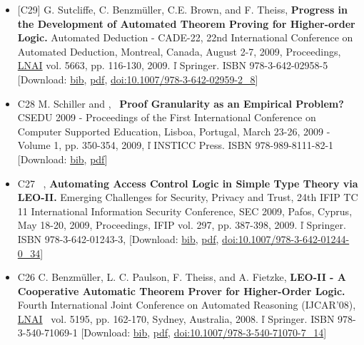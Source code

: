 \documentclass{article}
\newcommand{\tmtextbf}[1]{{\bfseries{#1}}}
\newcommand{\tmtextit}[1]{{\itshape{#1}}}
\newcommand{\tmtextmd}[1]{{\mdseries{#1}}}
\newcommand{\tmtextup}[1]{{\upshape{#1}}}
\newenvironment{itemizedot}{\begin{itemize} \renewcommand{\labelitemi}{$\bullet$}\renewcommand{\labelitemii}{$\bullet$}\renewcommand{\labelitemiii}{$\bullet$}\renewcommand{\labelitemiv}{$\bullet$}}{\end{itemize}}
\begin{document}
\begin{itemizedot}
  \item {\small [C29] G. Sutcliffe, C. Benzm\"uller, C.E. Brown, and F.
  Theiss, \tmtextbf{Progress in the Development of Automated Theorem Proving
  for Higher-order Logic.}} {\small Automated Deduction - CADE-22, 22nd
  International Conference on Automated Deduction, Montreal, Canada, August
  2-7, 2009, Proceedings, \href{http://www.springer.de/comp/lncs/}{LNAI} vol.
  5663, pp. 116-130, 2009.  \v{l}  Springer.} ISBN 978-3-642-02958-5
  {\color{grey} [Download: {\small \href{../papers/C29.bib}{bib},
  \href{../papers/C29.pdf}{pdf}}, {\small
  \href{http://dx.doi.org/10.1007/978-3-642-02959-2\_8}{doi:10.1007/978-3-642-02959-2\_8}}]}
  
  \item [C28] M. Schiller and {\small \tmtextit{\tmtextmd{\tmtextup{C.
  Benzm\"uller}}},} \ {\small \tmtextbf{Proof Granularity as an Empirical
  Problem?}} CSEDU 2009 - Proceedings of the First International Conference on
  Computer Supported Education, Lisboa, Portugal, March 23-26, 2009 - Volume
  1, pp. 350-354, 2009,  \v{l}  INSTICC Press. ISBN 978-989-8111-82-1
  {\color{grey} [Download: {\small \href{../papers/C28.bib}{bib}}, {\small
  \href{../papers/C28.pdf}{pdf}}]}
  
  \item [C27] \ {\small \tmtextit{\tmtextmd{\tmtextup{C. Benzm\"uller}}},}
  {\small \tmtextbf{Automating Access Control Logic in Simple Type Theory via
  LEO-II.}} Emerging Challenges for Security, Privacy and Trust, 24th IFIP TC
  11 International Information Security Conference, SEC 2009, Pafos, Cyprus,
  May 18-20, 2009, Proceedings, IFIP vol. 297, pp. 387-398, 2009.  \v{l} 
  Springer. ISBN 978-3-642-01243-3, {\color{grey} [Download: {\small
  \href{../papers/C27.bib}{bib}}, {\small \href{../papers/C27.pdf}{pdf}},
  {\small
  \href{http://dx.doi.org/10.1007/978-3-642-01244-0\_34}{doi:10.1007/978-3-642-01244-0\_34}}]}
  
  \item [C26] C. Benzm\"uller, L. C. Paulson, F. Theiss, and A. Fietzke,
  \tmtextbf{LEO-II - A Cooperative Automatic Theorem Prover for Higher-Order
  Logic.} Fourth International Joint Conference on Automated Reasoning
  (IJCAR'08), \href{http://www.springer.de/comp/lncs/}{LNAI} \ vol. 5195, pp.
  162-170, Sydney, Australia, 2008.  \v{l}  Springer. ISBN 978-3-540-71069-1
  {\color{grey} [Download: {\small \href{../papers/C26.bib}{bib}}, {\small
  \href{../papers/C26.pdf}{pdf}}, {\small
  \href{http://dx.doi.org/10.1007/978-3-540-71070-7\_14}{doi:10.1007/978-3-540-71070-7\_14}}]}
  

\end{itemizedot}
\end{document}
